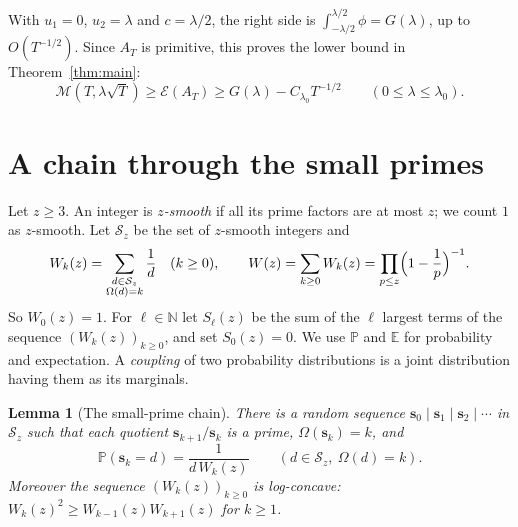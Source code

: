 \documentclass[11pt,a4paper]{article}
\numberwithin{equation}{section}
\theoremstyle{plain}
\newtheorem{lemma}[theorem]{Lemma}
\theoremstyle{definition}
\theoremstyle{remark}
\newcommand{\N}{\mathbb{N}}
\newcommand{\PP}{\mathbb{P}}
\newcommand{\EE}{\mathbb{E}}
\newcommand{\cE}{\mathcal{E}}
\newcommand{\cM}{\mathcal{M}}
\newcommand{\cS}{\mathcal{S}}
\newcommand{\bs}{\mathbf{s}}
\begin{document}
With $u_1=0$, $u_2=\lambda$ and $c=\lambda/2$, the right side is $\int_{-\lambda/2}^{\lambda/2}\phi=G(\lambda)$, up to $O(T^{-1/2})$. Since $A_T$ is primitive, this proves the lower bound in Theorem~\ref{thm:main}:
\begin{equation}\label{eq:lowerbound}
\cM(T,\lambda\sqrt T)\ge\cE(A_T)\ge G(\lambda)-C_{\lambda_0}T^{-1/2}\qquad(0\le\lambda\le\lambda_0).
\end{equation}

\section{A chain through the small primes}\label{sec:smooth}

Let $z\ge3$. An integer is \emph{$z$-smooth} if all its prime factors are at most $z$; we count $1$ as $z$-smooth. Let $\cS_z$ be the set of $z$-smooth integers and
\[
W_k(z)=\sum_{\substack{d\in\cS_z\\ \Omega(d)=k}}\frac1d\quad(k\ge0),\qquad
W(z)=\sum_{k\ge0}W_k(z)=\prod_{p\le z}\Bigl(1-\frac1p\Bigr)^{-1}.
\]
So $W_0(z)=1$. For $\ell\in\N$ let $S_\ell(z)$ be the sum of the $\ell$ largest terms of the sequence $(W_k(z))_{k\ge0}$, and set $S_0(z)=0$. We use $\PP$ and $\EE$ for probability and expectation. A \emph{coupling} of two probability distributions is a joint distribution having them as its marginals.

\begin{lemma}[The small-prime chain]\label{lem:smoothchain}
There is a random sequence $\bs_0\mid\bs_1\mid\bs_2\mid\cdots$ in $\cS_z$ such that each quotient $\bs_{k+1}/\bs_k$ is a prime, $\Omega(\bs_k)=k$, and
\begin{equation}\label{eq:smoothmarg}
\PP(\bs_k=d)=\frac{1}{d\,W_k(z)}\qquad(d\in\cS_z,\ \Omega(d)=k).
\end{equation}
Moreover the sequence $(W_k(z))_{k\ge0}$ is log-concave: $W_k(z)^2\ge W_{k-1}(z)W_{k+1}(z)$ for $k\ge1$.
\end{lemma}
\end{document}
